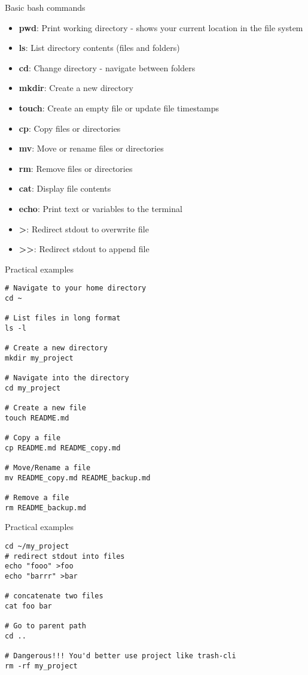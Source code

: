 \begin{frame}[fragile]{Basic bash commands}
	\begin{itemize}
		\item \textbf{pwd}: Print working directory - shows your current location in the file system
		\item \textbf{ls}: List directory contents (files and folders)
		\item \textbf{cd}: Change directory - navigate between folders
		\item \textbf{mkdir}: Create a new directory
		\item \textbf{touch}: Create an empty file or update file timestamps
		\item \textbf{cp}: Copy files or directories
		\item \textbf{mv}: Move or rename files or directories
		\item \textbf{rm}: Remove files or directories
		\item \textbf{cat}: Display file contents
		\item \textbf{echo}: Print text or variables to the terminal
		\item \textbf{>}: Redirect stdout to overwrite file
		\item \textbf{>>}: Redirect stdout to append file
	\end{itemize}
\end{frame}

\begin{frame}[fragile]{Practical examples}
	\begin{verbatim}
# Navigate to your home directory
cd ~

# List files in long format
ls -l

# Create a new directory
mkdir my_project

# Navigate into the directory
cd my_project

# Create a new file
touch README.md

# Copy a file
cp README.md README_copy.md

# Move/Rename a file
mv README_copy.md README_backup.md

# Remove a file
rm README_backup.md
	\end{verbatim}
\end{frame}

\begin{frame}[fragile]{Practical examples}
	\begin{verbatim}
cd ~/my_project
# redirect stdout into files
echo "fooo" >foo
echo "barrr" >bar

# concatenate two files
cat foo bar

# Go to parent path
cd ..

# Dangerous!!! You'd better use project like trash-cli
rm -rf my_project
	\end{verbatim}
\end{frame}

